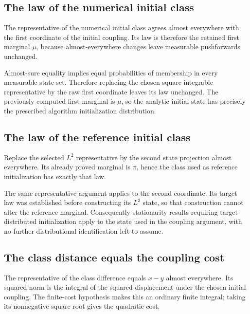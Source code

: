 \documentclass[11pt,a4paper]{report}
\begin{document}
\subsection{\texorpdfstring{The law of the numerical initial class}{The law of the numerical initial class}}
\label{report-step-UnadjustedLangevin-InitialExtension-lean-21}


The representative of the numerical initial class agrees almost everywhere with the first coordinate of the initial coupling. Its law is therefore the retained first marginal \(\mu\), because almost-everywhere changes leave measurable pushforwards unchanged.



Almost-sure equality implies equal probabilities of membership in every measurable state set. Therefore replacing the chosen square-integrable representative by the raw first coordinate leaves its law unchanged. The previously computed first marginal is \(\mu\), so the analytic initial state has precisely the prescribed algorithm initialization distribution.

\subsection{\texorpdfstring{The law of the reference initial class}{The law of the reference initial class}}
\label{report-step-UnadjustedLangevin-InitialExtension-lean-22}


Replace the selected \(L^2\) representative by the second state projection almost everywhere. Its already proved marginal is \(\pi\), hence the class used as reference initialization has exactly that law.



The same representative argument applies to the second coordinate. Its target law was established before constructing its \(L^2\) state, so that construction cannot alter the reference marginal. Consequently stationarity results requiring target-distributed initialization apply to the state used in the coupling argument, with no further distributional identification left to assume.

\subsection{\texorpdfstring{The class distance equals the coupling cost}{The class distance equals the coupling cost}}
\label{report-step-UnadjustedLangevin-InitialExtension-lean-23}


The representative of the class difference equals \(x-y\) almost everywhere. Its squared norm is the integral of the squared displacement under the chosen initial coupling. The finite-cost hypothesis makes this an ordinary finite integral; taking its nonnegative square root gives the quadratic cost.
\end{document}
